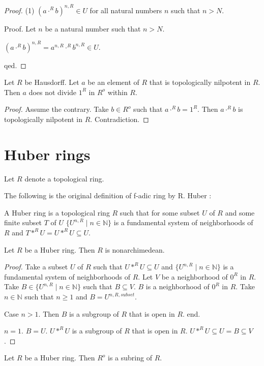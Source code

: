 \documentclass[english,11pt]{article}
\newcommand{\Powers}[2]{\{{#1}^{n,#2} \mid n \in \mathbb{N}\}}
\begin{document}
\begin{forthel}
\begin{proof}
(1) $(a \cdot^{R} b)^{n,R} \in U$ for all natural numbers $n$ such that $n > N$.

Proof. Let $n$ be a natural number such that $n > N$.

$(a \cdot^{R} b)^{n,R} = a^{n,R} \cdot^{R} b^{n,R} \in U$. 

qed. 
\end{proof}

\begin{lemma} Let $R$ be Hausdorff.
Let $a$ be an element of $R$ that is topologically nilpotent in $R$.
Then $a$ does not divide $1^{R}$ in $R^o$ within $R$.
\end{lemma}
\begin{proof}
Assume the contrary. 
Take $b \in R^o$ such that $a \cdot^{R} b = 1^{R}$.
Then  $a \cdot^{R} b$ is topologically nilpotent in $R$.
Contradiction.
\end{proof}

\end{forthel}

\section{Huber rings}
\begin{forthel}

Let $R$ denote a topological ring.
\end{forthel}
The following is the original definition of f-adic ring by R. Huber \cite{Huber1993}:
\begin{forthel}

\begin{definition}
A Huber ring is a topological ring $R$ such that for some subset $U$ of $R$
and some finite subset $T$ of $U$ 
$\Powers{U}{R}$ is a fundamental system of neighborhoods of $R$ and
$T \ast^{R} U = U \ast^{R} U \subseteq U$. 
\end{definition}

\begin{lemma}
Let $R$ be a Huber ring. Then $R$ is nonarchimedean.
\end{lemma}
\begin{proof}
Take a subset $U$ of $R$
such that $U \ast^{R} U \subseteq U$ and 
$\Powers{U}{R}$ is a fundamental system of neighborhoods of $R$.
Let $V$ be a neighborhood of $0^{R}$ in $R$.
Take $B \in \Powers{U}{R}$ such that $B \subseteq V$.
$B$ is a neighborhood of $0^{R}$ in $R$.
Take $n \in \mathbb{N}$ such that $n \geq 1$ and $B = U^{n,R,subset}$.

Case $n > 1$.
Then $B$ is a subgroup of $R$ that is open in $R$.
end.

$n = 1$. $B = U$. $U \ast^{R} U $ is a subgroup
of $R$ that is open in $R$.
$U \ast^{R} U \subseteq U = B \subseteq V$.
\end{proof}

\begin{lemma}
Let $R$ be a Huber ring. Then $R^o$ is a subring of $R$.
\end{lemma}
\end{forthel}
\end{document}
